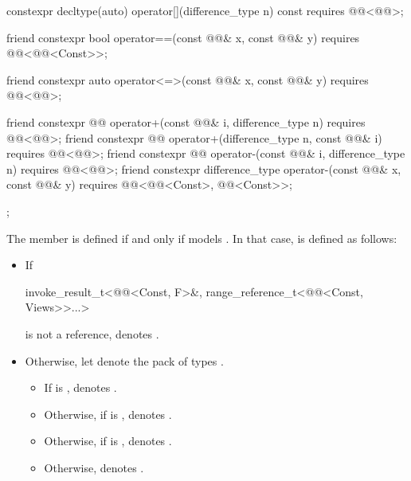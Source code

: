 \begin{codeblock}
{{    constexpr decltype(auto) operator[](difference_type n) const
      requires @@<@@>;

    friend constexpr bool operator==(const @@& x, const @@& y)
      requires @@<@@<Const>>;

    friend constexpr auto operator<=>(const @@& x, const @@& y)
      requires @@<@@>;

    friend constexpr @@ operator+(const @@& i, difference_type n)
      requires @@<@@>;
    friend constexpr @@ operator+(difference_type n, const @@& i)
      requires @@<@@>;
    friend constexpr @@ operator-(const @@& i, difference_type n)
      requires @@<@@>;
    friend constexpr difference_type operator-(const @@& x, const @@& y)
      requires @@<@@<Const>, @@<Const>>;
  };
}
\end{codeblock}

\pnum
The member 
is defined if and only if  models .
In that case,
 is defined as follows:
\begin{itemize}
\item
If
\begin{codeblock}
invoke_result_t<@@<Const, F>&, range_reference_t<@@<Const, Views>>...>
\end{codeblock}
is not a reference,
 denotes .
\item
Otherwise, let  denote the pack of types
.
\begin{itemize}
\item
If 
is ,
 denotes .
\item
Otherwise,
if 
is ,
 denotes .
\item
Otherwise,
if 
is ,
 denotes .
\item
Otherwise,  denotes .
\end{itemize}
\end{itemize}

